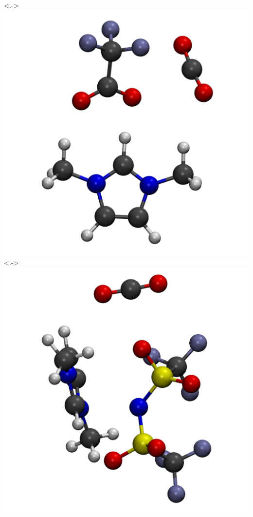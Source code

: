 \documentclass[xcolor=usenames,dvipsnames,svgnames]{beamer}
\begin{document}
\begin{frame}
\begin{columns}
    \uncover<.->{\includegraphics[scale=0.07]{./figures/cluster_TFA.png}}
    \uncover<.->{\includegraphics[scale=0.08]{./figures/cluster_Tf2N.png}}

\end{columns}
\end{frame}
\end{document}
